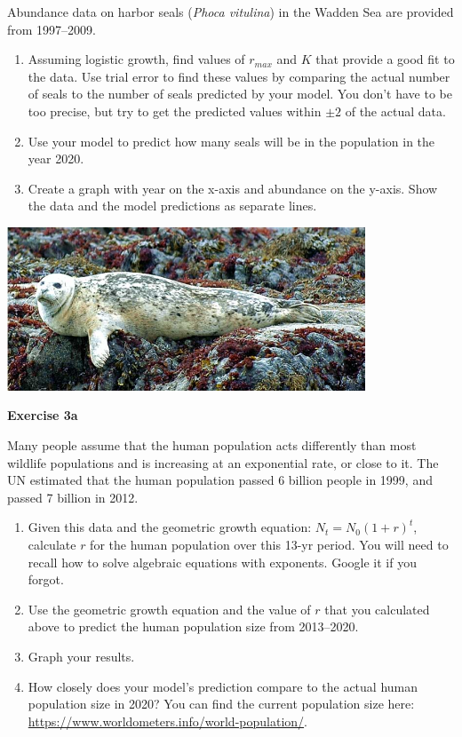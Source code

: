 \documentclass[12pt]{article}\usepackage[]{graphicx}\usepackage[]{color}
\begin{document}
Abundance data on harbor seals ({\it Phoca vitulina}) in the Wadden
Sea are provided from 1997--2009.

\begin{enumerate}
  \item Assuming logistic growth, find values of $r_{max}$ and $K$
    that provide a good fit to the data. Use trial error to find these
    values by comparing the actual number of seals to the number of
    seals predicted by your model. You don't have to be too
    precise, but try to get the predicted values within $\pm 2$ of the
    actual data.
  \item Use your model to predict how many seals will be in the
    population in the year 2020.
  \item Create a graph with year on the x-axis and abundance on the
    y-axis. Show the data and the model predictions as separate
    lines. 
\end{enumerate}

\vspace{24pt}

{
  \centering
  \includegraphics[width=0.8\textwidth]{figs/pacific-harbor-seal} \\
}



\clearpage

{\bf Exercise 3a \\}


Many people assume that the human population acts differently than
most wildlife populations and is increasing at an exponential rate, or
close to it. The UN estimated that the human population passed 6
billion people in 1999, and passed 7 billion in 2012. 

\begin{enumerate}
  \item Given this data and the geometric growth equation:
    $N_t = N_0(1+r)^t$, calculate $r$ for the human population over
    this 13-yr period. You will need to recall how to solve algebraic
    equations with exponents. Google it if you forgot.
  \item Use the geometric growth equation and the value of $r$ that
    you calculated above to predict the human population size from 
    2013--2020.
  \item Graph your results.
  \item How closely does your model's prediction compare to the actual
    human population size in 2020? You can find the current population
    size here: \url{https://www.worldometers.info/world-population/}.
\end{enumerate}
\end{document}
